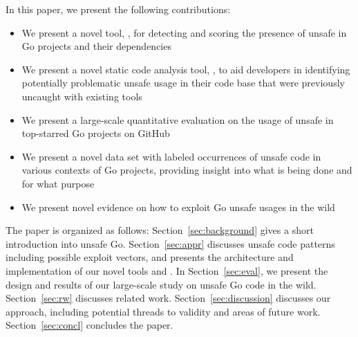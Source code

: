 In this paper, we present the following contributions:

\begin{itemize}
\item We present a novel tool, \toolUsage{}, for detecting and scoring the presence of unsafe in Go projects and their dependencies
\item We present a novel static code analysis tool, \toolSA{}, to aid developers in identifying potentially problematic unsafe usage in their code base that were previously uncaught with existing tools
\item We present a large-scale quantitative evaluation on the usage of unsafe in \projsAnalyzed{} top-starred Go projects on GitHub
\item We present a novel data set with  labeled occurrences of unsafe code in various contexts of Go projects, providing insight into what is being done and for what purpose
\item We present novel evidence on how to exploit Go unsafe usages in the wild
\end{itemize}

The paper is organized as follows:
Section~\ref{sec:background} gives a short introduction into unsafe Go.
Section~\ref{sec:appr} discusses unsafe code patterns including possible exploit vectors, and presents the architecture and implementation of our novel tools \toolUsage{} and \toolSA{}.
In Section~\ref{sec:eval}, we present the design and results of our large-scale study on unsafe Go code in the wild.
Section~\ref{sec:rw} discusses related work. 
Section~\ref{sec:discussion} discusses our approach, including potential threads to validity and areas of future work.
Section~\ref{sec:concl} concludes the paper.

